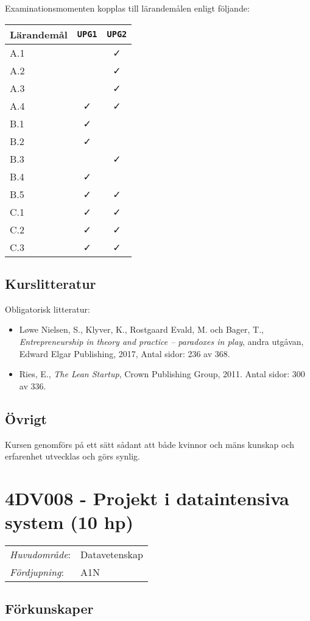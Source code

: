 Examinationsmomenten kopplas till lärandemålen enligt följande:

\begin{longtable}[]{@{}lcc@{}}
\toprule
\textsf{Lärandemål} & \texttt{UPG1} & \texttt{UPG2}\tabularnewline
\midrule
\endhead
A.1 & & \faCheck\tabularnewline
A.2 & & \faCheck\tabularnewline
A.3 & & \faCheck\tabularnewline
A.4 & \faCheck & \faCheck\tabularnewline
B.1 & \faCheck &\tabularnewline
B.2 & \faCheck &\tabularnewline
B.3 & & \faCheck\tabularnewline
B.4 & \faCheck &\tabularnewline
B.5 & \faCheck & \faCheck\tabularnewline
C.1 & \faCheck & \faCheck\tabularnewline
C.2 & \faCheck & \faCheck\tabularnewline
C.3 & \faCheck & \faCheck\tabularnewline
\bottomrule
\end{longtable}

\subsection*{Kurslitteratur}

Obligatorisk litteratur:

\begin{itemize}
\tightlist
\item
  Løwe Nielsen, S., Klyver, K., Rostgaard Evald, M. och Bager, T.,
  \emph{Entrepreneurship in theory and practice -- paradoxes in play},
  andra utgåvan, Edward Elgar Publishing, 2017, Antal sidor: 236 av 368.
\item
  Ries, E., \emph{The Lean Startup}, Crown Publishing Group, 2011. Antal
  sidor: 300 av 336.
\end{itemize}

\subsection*{Övrigt}

Kursen genomförs på ett sätt sådant att både kvinnor och mäns kunskap och erfarenhet utvecklas och görs synlig.
\pagebreak
\section*{4DV008 - Projekt i dataintensiva system (10 hp)}

\begin{tabular}{ll}\emph{Huvudområde}: & Datavetenskap\tabularnewline\emph{Fördjupning}: & A1N\tabularnewline\end{tabular}

\subsection*{Förkunskaper}

